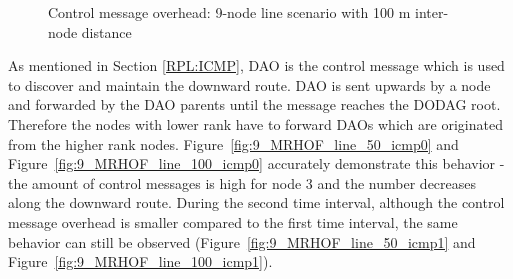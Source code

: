 \begin{figure}[p]
  \begin{center}
    \leavevmode
    \caption{Control message overhead: 9-node line scenario with 100 m inter-node distance}
    \label{fig:9_MRHOF_line_100_icmp}
  \end{center}
   \vspace{-20pt}
\end{figure}

As mentioned in Section \ref{RPL:ICMP}, DAO is the control message which is used to discover and maintain the downward  route. DAO is sent upwards by a node and forwarded by the DAO parents until the message reaches the DODAG root. Therefore the nodes with lower rank have to forward DAOs which are originated from the higher rank nodes. Figure~\ref{fig:9_MRHOF_line_50_icmp0} and Figure~\ref{fig:9_MRHOF_line_100_icmp0} accurately demonstrate this behavior - the amount of control messages is high for node 3 and the number decreases along the downward route. During the second time interval, although the control message overhead is smaller compared to the first time interval, the same behavior can still be observed (Figure~\ref{fig:9_MRHOF_line_50_icmp1} and Figure~\ref{fig:9_MRHOF_line_100_icmp1}).

